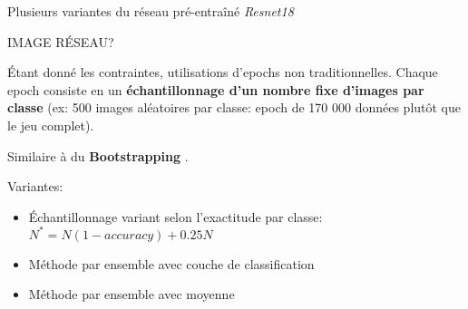\vspace{-15pt}
Plusieurs variantes du réseau pré-entraîné \emph{Resnet18}
\begin{center}
IMAGE RÉSEAU?
      
\end{center}

Étant donné les contraintes, utilisations d'epochs non traditionnelles. Chaque epoch consiste en un \textbf{échantillonnage d'un nombre fixe d'images par classe} (ex: 500 images aléatoires par classe: epoch de 170 000 données plutôt que le jeu complet).

Similaire à du \textbf{Bootstrapping} .


Variantes:

\begin{itemize}
\item Échantillonnage variant selon l'exactitude par classe: $N^*=N(1-accuracy) +0.25N$
\item Méthode par ensemble avec couche de classification
\item Méthode par ensemble avec moyenne
\end{itemize}